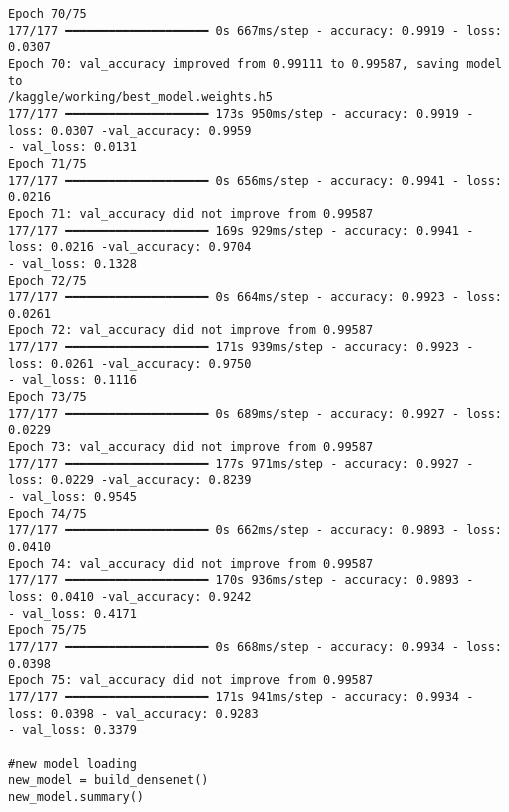 \documentclass[12pt, English]{article}
\begin{document}
\begin{normalsize}
\begin{verbatim}
Epoch 70/75
177/177 ━━━━━━━━━━━━━━━━━━━━ 0s 667ms/step - accuracy: 0.9919 - loss: 0.0307
Epoch 70: val_accuracy improved from 0.99111 to 0.99587, saving model to
/kaggle/working/best_model.weights.h5
177/177 ━━━━━━━━━━━━━━━━━━━━ 173s 950ms/step - accuracy: 0.9919 - loss: 0.0307 -val_accuracy: 0.9959 
- val_loss: 0.0131
Epoch 71/75
177/177 ━━━━━━━━━━━━━━━━━━━━ 0s 656ms/step - accuracy: 0.9941 - loss: 0.0216
Epoch 71: val_accuracy did not improve from 0.99587
177/177 ━━━━━━━━━━━━━━━━━━━━ 169s 929ms/step - accuracy: 0.9941 - loss: 0.0216 -val_accuracy: 0.9704 
- val_loss: 0.1328
Epoch 72/75
177/177 ━━━━━━━━━━━━━━━━━━━━ 0s 664ms/step - accuracy: 0.9923 - loss: 0.0261
Epoch 72: val_accuracy did not improve from 0.99587
177/177 ━━━━━━━━━━━━━━━━━━━━ 171s 939ms/step - accuracy: 0.9923 - loss: 0.0261 -val_accuracy: 0.9750 
- val_loss: 0.1116
Epoch 73/75
177/177 ━━━━━━━━━━━━━━━━━━━━ 0s 689ms/step - accuracy: 0.9927 - loss: 0.0229
Epoch 73: val_accuracy did not improve from 0.99587
177/177 ━━━━━━━━━━━━━━━━━━━━ 177s 971ms/step - accuracy: 0.9927 - loss: 0.0229 -val_accuracy: 0.8239 
- val_loss: 0.9545
Epoch 74/75
177/177 ━━━━━━━━━━━━━━━━━━━━ 0s 662ms/step - accuracy: 0.9893 - loss: 0.0410
Epoch 74: val_accuracy did not improve from 0.99587
177/177 ━━━━━━━━━━━━━━━━━━━━ 170s 936ms/step - accuracy: 0.9893 - loss: 0.0410 -val_accuracy: 0.9242 
- val_loss: 0.4171
Epoch 75/75
177/177 ━━━━━━━━━━━━━━━━━━━━ 0s 668ms/step - accuracy: 0.9934 - loss: 0.0398
Epoch 75: val_accuracy did not improve from 0.99587
177/177 ━━━━━━━━━━━━━━━━━━━━ 171s 941ms/step - accuracy: 0.9934 - loss: 0.0398 - val_accuracy: 0.9283 
- val_loss: 0.3379

#new model loading
new_model = build_densenet()
new_model.summary()


\end{verbatim}
\end{normalsize}
\end{document}
